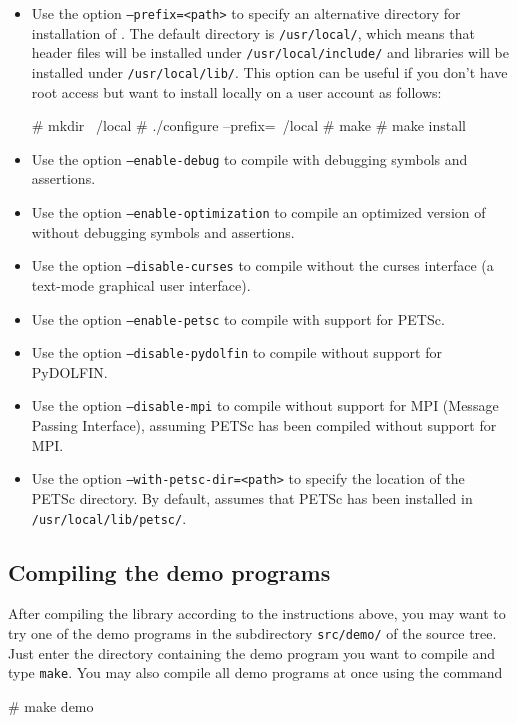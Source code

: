 \begin{itemize}
\item
  Use the option \texttt{--prefix=<path>} to specify an alternative
  directory for installation of \dolfin{}. The default directory is
  \texttt{/usr/local/}, which means that header files will be
  installed under \texttt{/usr/local/include/} and libraries will be
  installed under \texttt{/usr/local/lib/}. This option can be useful
  if you don't have root access but want to install \dolfin{} locally
  on a user account as follows:
  \begin{code}
# mkdir ~/local
# ./configure --prefix=~/local
# make
# make install
  \end{code}
\item
  Use the option \texttt{--enable-debug} to compile \dolfin{} with
  debugging symbols and assertions.
\item
  Use the option \texttt{--enable-optimization} to compile an
  optimized version of \dolfin{} without debugging symbols
  and assertions.
\item
  Use the option \texttt{--disable-curses} to compile \dolfin{}
  without the curses interface (a text-mode graphical user interface).
\item
  Use the option \texttt{--enable-petsc} to compile \dolfin{} with
  support for PETSc.
\item
  Use the option \texttt{--disable-pydolfin} to compile without
  support for PyDOLFIN.
\item
  Use the option \texttt{--disable-mpi} to compile \dolfin{} without
  support for MPI (Message Passing Interface), assuming PETSc has been
  compiled without support for MPI.
\item
  Use the option \texttt{--with-petsc-dir=<path>} to specify the
  location of the PETSc directory. By default, \dolfin{} assumes that
  PETSc has been installed in \texttt{/usr/local/lib/petsc/}.
\end{itemize}

\subsection{Compiling the demo programs}

After compiling the \dolfin{} library according to the instructions
above, you may want to try one of the demo programs in the
subdirectory \texttt{src/demo/} of the \dolfin{} source tree.
Just enter the directory containing the demo program you want to
compile and type \texttt{make}. You may also compile all demo programs
at once using the command
\begin{code}
# make demo
\end{code}

